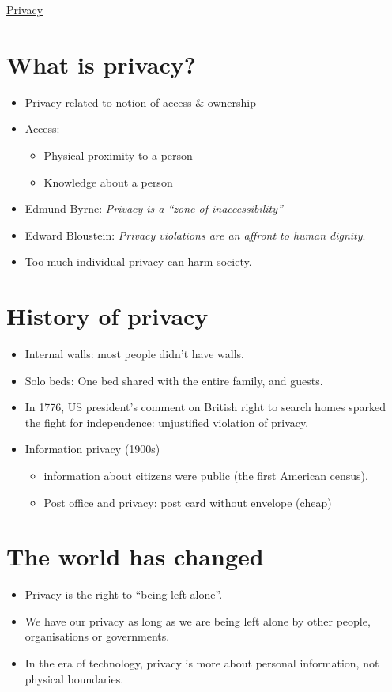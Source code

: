 \documentclass{article}
\begin{document}
\begin{center}
	\underline{\huge Privacy}
\end{center}


\section{What is privacy?}
\begin{itemize}
\item Privacy related to notion of access \& ownership
\item Access:
\begin{itemize}
\item Physical proximity to a person
\item Knowledge about a person
\end{itemize}
\item Edmund Byrne: \emph{Privacy is a ``zone of inaccessibility''}
\item Edward Bloustein: \emph{Privacy violations are an affront to human dignity}.
\item Too much individual privacy can harm society.
\end{itemize}



\section{History of privacy}
\begin{itemize}
\item Internal walls: most people didn't have walls.
\item Solo beds: One bed shared with the entire family, and guests.
\item In 1776, US president's comment on British right to search homes sparked the fight for independence: unjustified violation of privacy.
\item Information privacy (1900s)
\begin{itemize}
\item information about citizens were public (the first  American census). 
\item Post office and privacy: post card without envelope (cheap)
\end{itemize}
\end{itemize}



\section{The world has changed}
\begin{itemize}
\item Privacy is the right to ``being left alone''.
\item We have our privacy as long as we are being left alone by other people, organisations or governments.
\item In the era of technology, privacy is more about personal information, not physical boundaries.
\end{itemize}
\end{document}
